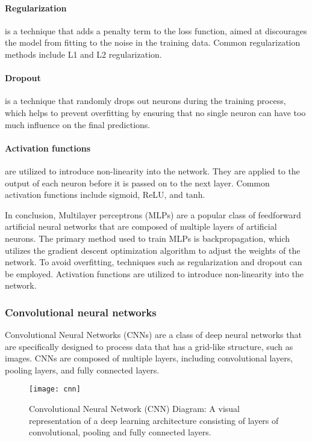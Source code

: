 \paragraph {Regularization} is a technique that adds a penalty term to the loss function, aimed at discourages the model from fitting to the noise in the training data. Common regularization methods include L1 and L2 regularization.

\paragraph {Dropout} is a technique that randomly drops out neurons during the training process, which helps to prevent overfitting by ensuring that no single neuron can have too much influence on the final predictions.

\paragraph{Activation functions} are utilized to introduce non-linearity into the network. They are applied to the output of each neuron before it is passed on to the next layer. Common activation functions include sigmoid, ReLU, and tanh.

In conclusion, Multilayer perceptrons (MLPs) are a popular class of feedforward artificial neural networks that are composed of multiple layers of artificial neurons.
The primary method used to train MLPs is backpropagation, which utilizes the gradient descent optimization algorithm to adjust the weights of the network.
To avoid overfitting, techniques such as regularization and dropout can be employed.
Activation functions are utilized to introduce non-linearity into the network.



\subsubsection{Convolutional neural networks}
Convolutional Neural Networks (CNNs) are a class of deep neural networks that are specifically designed to process data that has a grid-like structure, such as images.
CNNs are composed of multiple layers, including convolutional layers, pooling layers, and fully connected layers.


\begin{figure}[ht]
  \centering
  \texttt{[image: cnn]}
  \caption{Convolutional Neural Network (CNN) Diagram: A visual representation of a deep learning architecture consisting of layers of convolutional, pooling and fully connected layers. \cite{shah}}
\end{figure}

